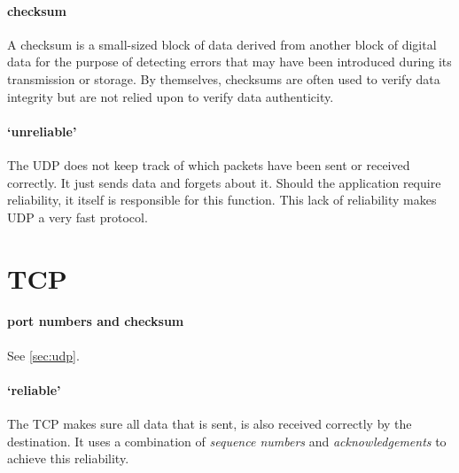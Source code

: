 \paragraph{checksum}
A checksum is a small-sized block of data derived from another block of digital data for the purpose of detecting errors that may have been introduced during its transmission or storage.
By themselves, checksums are often used to verify data integrity but are not relied upon to verify data authenticity.

\paragraph{`unreliable'}
The \ac{UDP} does not keep track of which packets have been sent or received correctly.
It just sends data and forgets about it.
Should the application require reliability, it itself is responsible for this function.
This lack of reliability makes \ac{UDP} a very fast protocol.

\section{\acl{TCP}}
\label{sec:tcp}


\paragraph{port numbers and checksum}
See \cref{sec:udp}.

\paragraph{`reliable'}
The \ac{TCP} makes sure all data that is sent, is also received correctly by the destination.
It uses a combination of \emph{sequence numbers} and \emph{acknowledgements} to achieve this reliability.

